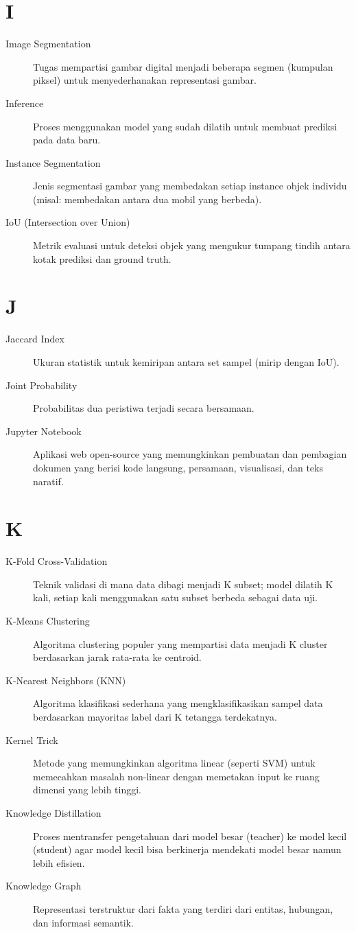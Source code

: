 \section*{I}
\begin{description}
    \item[Image Segmentation] Tugas mempartisi gambar digital menjadi beberapa segmen (kumpulan piksel) untuk menyederhanakan representasi gambar.
    \item[Inference] Proses menggunakan model yang sudah dilatih untuk membuat prediksi pada data baru.
    \item[Instance Segmentation] Jenis segmentasi gambar yang membedakan setiap instance objek individu (misal: membedakan antara dua mobil yang berbeda).
    \item[IoU (Intersection over Union)] Metrik evaluasi untuk deteksi objek yang mengukur tumpang tindih antara kotak prediksi dan ground truth.
\end{description}

\section*{J}
\begin{description}
    \item[Jaccard Index] Ukuran statistik untuk kemiripan antara set sampel (mirip dengan IoU).
    \item[Joint Probability] Probabilitas dua peristiwa terjadi secara bersamaan.
    \item[Jupyter Notebook] Aplikasi web open-source yang memungkinkan pembuatan dan pembagian dokumen yang berisi kode langsung, persamaan, visualisasi, dan teks naratif.
\end{description}

\section*{K}
\begin{description}
    \item[K-Fold Cross-Validation] Teknik validasi di mana data dibagi menjadi K subset; model dilatih K kali, setiap kali menggunakan satu subset berbeda sebagai data uji.
    \item[K-Means Clustering] Algoritma clustering populer yang mempartisi data menjadi K cluster berdasarkan jarak rata-rata ke centroid.
    \item[K-Nearest Neighbors (KNN)] Algoritma klasifikasi sederhana yang mengklasifikasikan sampel data berdasarkan mayoritas label dari K tetangga terdekatnya.
    \item[Kernel Trick] Metode yang memungkinkan algoritma linear (seperti SVM) untuk memecahkan masalah non-linear dengan memetakan input ke ruang dimensi yang lebih tinggi.
    \item[Knowledge Distillation] Proses mentransfer pengetahuan dari model besar (teacher) ke model kecil (student) agar model kecil bisa berkinerja mendekati model besar namun lebih efisien.
    \item[Knowledge Graph] Representasi terstruktur dari fakta yang terdiri dari entitas, hubungan, dan informasi semantik.
\end{description}

